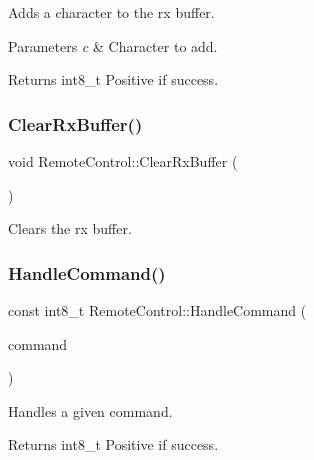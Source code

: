 Adds a character to the rx buffer. 


\begin{DoxyParams}{Parameters}
{\em c} & Character to add.\\
\hline
\end{DoxyParams}
\begin{DoxyReturn}{Returns}
int8\+\_\+t Positive if success. 
\end{DoxyReturn}
\mbox{\label{classRemoteControl_a2c903c1cce31327c040450f0ce9ef558}} 
\subsubsection{\texorpdfstring{ClearRxBuffer()}{ClearRxBuffer()}}
{\footnotesize\ttfamily void Remote\+Control\+::\+Clear\+Rx\+Buffer (\begin{DoxyParamCaption}{ }\end{DoxyParamCaption})}



Clears the rx buffer. 

\mbox{\label{classRemoteControl_a0117ce47c6b69ad679b6570930b89e9d}} 
\subsubsection{\texorpdfstring{HandleCommand()}{HandleCommand()}}
{\footnotesize\ttfamily const int8\+\_\+t Remote\+Control\+::\+Handle\+Command (\begin{DoxyParamCaption}\item[{\mbox{\hyperlink{classRemoteControlCommand}{Remote\+Control\+Command}} \&\&}]{command }\end{DoxyParamCaption})}



Handles a given command. 

\begin{DoxyReturn}{Returns}
int8\+\_\+t Positive if success. 
\end{DoxyReturn}
\mbox{\label{classRemoteControl_aa513b841c71c24aaa9637e58ece1be53}} 
